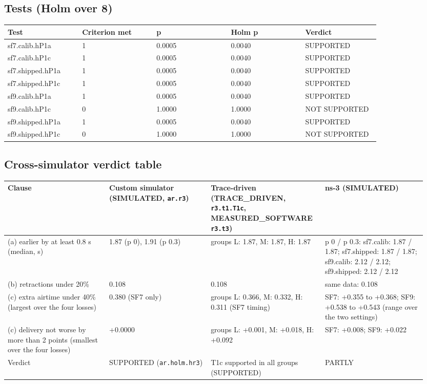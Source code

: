 \subsection*{Tests (Holm over 8)}

{\scriptsize\raggedright
\begin{longtable}{p{0.190\linewidth}p{0.190\linewidth}p{0.190\linewidth}p{0.190\linewidth}p{0.190\linewidth}}
\toprule
Test & Criterion met & p & Holm p & Verdict \\
\midrule
\endhead
sf7.calib.hP1a & 1 & 0.0005 & 0.0040 & SUPPORTED \\
sf7.calib.hP1c & 1 & 0.0005 & 0.0040 & SUPPORTED \\
sf7.shipped.hP1a & 1 & 0.0005 & 0.0040 & SUPPORTED \\
sf7.shipped.hP1c & 1 & 0.0005 & 0.0040 & SUPPORTED \\
sf9.calib.hP1a & 1 & 0.0005 & 0.0040 & SUPPORTED \\
sf9.calib.hP1c & 0 & 1.0000 & 1.0000 & NOT SUPPORTED \\
sf9.shipped.hP1a & 1 & 0.0005 & 0.0040 & SUPPORTED \\
sf9.shipped.hP1c & 0 & 1.0000 & 1.0000 & NOT SUPPORTED \\
\bottomrule
\end{longtable}}

\subsection*{Cross-simulator verdict table}

{\scriptsize\raggedright
\begin{longtable}{p{0.237\linewidth}p{0.237\linewidth}p{0.237\linewidth}p{0.237\linewidth}}
\toprule
Clause & Custom simulator (SIMULATED, \texttt{ar.r3}) & Trace-driven (TRACE\_DRIVEN, \texttt{r3.t1.T1c}, MEASURED\_SOFTWARE \texttt{r3.t3}) & ns-3 (SIMULATED) \\
\midrule
\endhead
(a) earlier by at least 0.8 s (median, s) & 1.87 (p 0), 1.91 (p 0.3) & groups L: 1.87, M: 1.87, H: 1.87 & p 0 / p 0.3: sf7.calib: 1.87 / 1.87; sf7.shipped: 1.87 / 1.87; sf9.calib: 2.12 / 2.12; sf9.shipped: 2.12 / 2.12 \\
(b) retractions under 20\% & 0.108 & 0.108 & same data: 0.108 \\
(c) extra airtime under 40\% (largest over the four losses) & 0.380 (SF7 only) & groups L: 0.366, M: 0.332, H: 0.311 (SF7 timing) & SF7: +0.355 to +0.368; SF9: +0.538 to +0.543 (range over the two settings) \\
(c) delivery not worse by more than 2 points (smallest over the four losses) & +0.0000 & groups L: +0.001, M: +0.018, H: +0.092 & SF7: +0.008; SF9: +0.022 \\
Verdict & SUPPORTED (\texttt{ar.holm.hr3}) & T1c supported in all groups (SUPPORTED) & PARTLY \\
\bottomrule
\end{longtable}}

